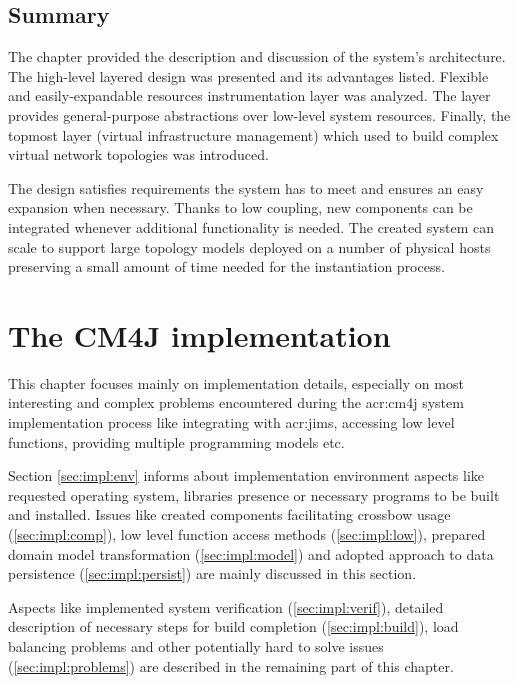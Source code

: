 \documentclass[11pt,openany]{book}
\begin{document}
    \section*{Summary}


      The chapter provided the description and discussion of the system's architecture. The high-level layered design was
      presented and its advantages listed. Flexible and easily-expandable resources instrumentation layer was analyzed.
      The layer provides general-purpose abstractions over low-level system resources.  Finally, the topmost layer 
      (virtual infrastructure management) which used to build complex virtual network topologies was introduced.

      The design satisfies requirements the system has to meet and ensures an easy expansion when necessary. Thanks to low
      coupling, new components can be integrated whenever additional functionality is needed. The created system can
      scale to support large topology models deployed on a number of physical hosts preserving a small amount of time
      needed for the instantiation process.


  \chapter{The CM4J implementation}
  \label{chap:impl}


    This chapter focuses mainly on implementation details, especially on most interesting and complex problems
    encountered during the \gls{acr:cm4j} system implementation process  like integrating with \gls{acr:jims}, accessing
    low level functions, providing multiple programming models etc.

    Section \ref{sec:impl:env} informs about  implementation environment aspects like requested operating system,
    libraries presence or necessary programs to be built and installed. Issues like created components facilitating
    crossbow usage (\ref{sec:impl:comp}), low level function access methods (\ref{sec:impl:low}), prepared domain model
    transformation (\ref{sec:impl:model}) and adopted approach to data persistence (\ref{sec:impl:persist}) are mainly
    discussed in this section.

    Aspects like implemented system verification (\ref{sec:impl:verif}), detailed description of necessary steps for
    build completion (\ref{sec:impl:build}), load balancing problems and other potentially hard to solve issues
    (\ref{sec:impl:problems}) are described in the remaining part of this chapter.
\end{document}
